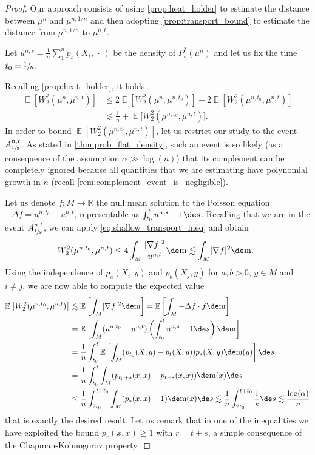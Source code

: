 \documentclass[10pt]{amsart}
\theoremstyle{plain}
\theoremstyle{definition}
\numberwithin{equation}{section}
\newcommand{\RR}{\ensuremath{\mathbb R}}
\newcommand{\E}[1]{\ensuremath{\operatorname{\mathbb{E}}\left[#1\right]}}
\newcommand{\bE}[1]{\ensuremath{\operatorname{\mathbb{E}}\bigl[#1\bigr]}}
\newcommand{\emptyparam}{\ensuremath{\,\cdot\,}}
\newcommand{\lapl}{\ensuremath{\Delta}}
\newcommand{\fullstop}{\ensuremath{\text{. }}}
\newcommand{\m}{\ensuremath{\mathrm m}}
\DeclarePairedDelimiter\abs{\lvert}{\rvert}
\begin{document}
\begin{proof}
Our approach consists of using \cref{prop:heat_holder} to estimate the distance between $\mu^n$ and
$\mu^{n,1/n}$ and then adopting \cref{prop:transport_bound} to estimate the distance
from $\mu^{n,1/n}$ to $\mu^{n,t}$.

Let $u^{n,s}=\frac 1n\sum_1^np_s(X_i,\emptyparam)$ be the density of $P_s^*(\mu^n)$ and
let us fix the time $t_0=\sfrac1n$.

Recalling \cref{prop:heat_holder}, it holds
\begin{align*}
\E{W_2^2(\mu^n, \mu^{n,t})}&\le 2\E{W_2^2(\mu^n, \mu^{n,t_0})} + 2\E{W_2^2(\mu^{n,t_0}, \mu^{n,t})} \\
&\lesssim \frac1n + \bE{W_2^2(\mu^{n,t_0}, \mu^{n,t})}.
\end{align*}
In order to bound $\E{W_2^2(\mu^{n,t_0}, \mu^{n,t})}$, let us restrict our study to the event
$A^{n,t}_{\sfrac12}$.
As stated in \cref{thm:prob_flat_density}, such an event is so likely (as a consequence of the
assumption $\alpha\gg\log(n)$) that its complement can be completely ignored because all
quantities that we are estimating have polynomial growth in $n$ (recall
\cref{rem:complement_event_is_negligible}).

Let us denote $f:M\to\RR$ the null mean solution to the Poisson equation $-\lapl f = u^{n,t_0}-u^{n,t}$,
representable as $\int_{t_0}^t u^{n,s}-1\de s$.
Recalling that we are in the event $A^{n,t}_{\sfrac12}$, we can apply \cref{eq:shallow_transport_ineq}
and obtain
\begin{equation*}
W_2^2(\mu^{n,t_0}, \mu^{n,t})\le
4\int_M \frac{\abs{\nabla f}^2}{u^{n,t}}\de\m \lesssim \int_M \abs{\nabla f}^2\de\m \fullstop
\end{equation*}
Using the independence of $p_a(X_i,y)$ and $p_b(X_j,y)$ for $a,b>0$, $y\in M$ and $i\neq j$,
we are now able to compute the expected value
\begin{align*}
\E{W_2^2(\mu^{n,t_0}, \mu^{n,t})} &\lesssim
\E{\int_M \abs{\nabla f}^2\de\m}
= \E{\int_M -\lapl f \cdot f\de\m} \\
&= \E{\int_M (u^{n,t_0}-u^{n,t})\left(\int_{t_0}^t u^{n,s}-1\de s\right)\de\m} \\
&=\frac1n\int_{t_0}^t\E{\int_M (p_{t_0}(X, y)-p_t(X,y))p_s(X,y)\de\m(y)} \de s \\
&=\frac1n\int_{t_0}^t\int_M (p_{t_0+s}(x, x)-p_{t+s}(x,x))\de\m(x) \de s\\
&\le \frac1n\int_{2t_0}^{t+t_0}\int_M (p_{s}(x, x)-1)\de\m(x) \de s
\lesssim\frac1n\int_{2t_0}^{t+t_0}\frac1s \de s
\lesssim \frac{\log(\alpha)}{n}
\end{align*}
that is exactly the desired result. Let us remark that in one of the inequalities we have exploited
the bound $p_r(x, x )\ge 1$ with $r=t+s$, a simple consequence of the Chapman-Kolmogorov property.
\end{proof}
\end{document}
